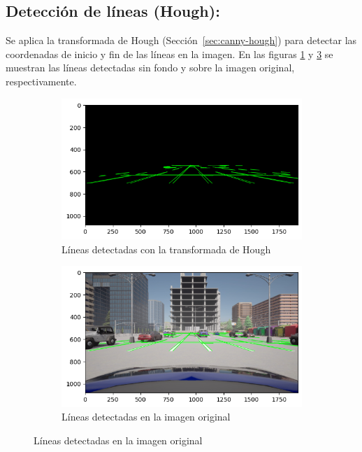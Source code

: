 \subsection{Detección de líneas (Hough):}

Se aplica la transformada de Hough \cite{ballard1981hough} (Sección~\ref{sec:canny-hough}) para detectar las coordenadas de inicio y fin de las líneas en la imagen.
En las figuras \ref{fig:hough} y \ref{fig:lines} se muestran las líneas detectadas sin fondo y sobre la imagen original, respectivamente.
\begin{figure}[!ht]
    \begin{subfigure}{0.5\textwidth}
        \includegraphics[width=\textwidth]{img/reticule/hough2}
        \caption{Líneas detectadas con la transformada de Hough}
        \label{fig:hough}
    \end{subfigure}
    \begin{subfigure}{0.5\textwidth}
        \includegraphics[width=\textwidth]{img/reticule/hough}
        \caption{Líneas detectadas en la imagen original}
        \label{fig:lines}
    \end{subfigure}
\end{figure}

